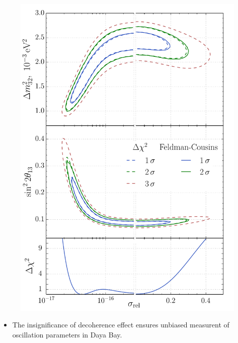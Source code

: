 \documentclass[a2paper, 8pt,hyperref={implicit=false,draft=false},usenames, dvipsnames]{beamer}
\newcommand{\Important}{\textcolor{BrickRed}}
\newcommand{\srel}{\ensuremath{\sigma_{\text{rel}}}}
\begin{document}
\begin{frame}
\begin{columns}[T]
\begin{column}{0.5\textwidth}
\begin{figure}
            \includegraphics[scale=0.3]{../pics/scan_db_s-dm-th_ihep-fc_v2.pdf}
            \end{figure}
            \begin{itemize}
            \item The \Important{insignificance} of decoherence effect ensures
                \Important{unbiased measurent} of oscillation parameters in Daya Bay.
            \end{itemize}
        \end{column}
    \end{columns}
\end{frame}
\end{document}
